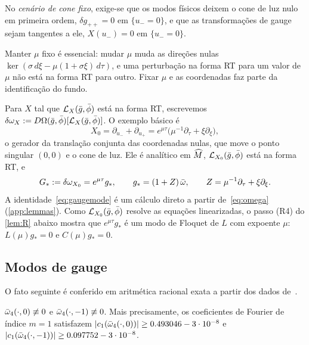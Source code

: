\begin{definition}\label{def:conefixed}
No \emph{cenário de cone fixo}, exige-se que os modos físicos deixem o cone de luz nulo em primeira ordem,
$\delta g_{++}=0$ em $\{u_-=0\}$, e que as transformações de gauge sejam tangentes a ele,
$X(u_-)=0$ em $\{u_-=0\}$.
\end{definition}

Manter $\mu$ fixo é essencial: mudar $\mu$ muda as direções nulas
$\ker(\sigma\,d\xi-\mu(1+\sigma\xi)\,d\tau)$, e uma perturbação na forma RT para um valor de $\mu$ não está na
forma RT para outro. Fixar $\mu$ e as coordenadas faz parte da identificação do fundo.

Para $X$ tal que $\mathcal{L}_X(\bar g,\bar\phi)$ está na forma RT, escrevemos
$\delta\omega_X:=D\Omega(\bar g,\bar\phi)[\mathcal{L}_X(\bar g,\bar\phi)]$. O exemplo básico é
\begin{equation}\label{eq:X0}
  X_0=\partial_{u_-}+\partial_{u_+}=e^{\mu\tau}\big(\mu^{-1}\partial_\tau+\xi\partial_\xi\big),
\end{equation}
o gerador da translação conjunta das coordenadas nulas, que move o ponto singular $(0,0)$ e
o cone de luz. Ele é analítico em $\widehat M$, $\mathcal{L}_{X_0}(\bar g,\bar\phi)$ está na forma RT, e
\begin{equation}\label{eq:gaugemode}
  G_*:=\delta\omega_{X_0}=e^{\mu\tau}g_*,\qquad g_*=(1+Z)\,\bar\omega,\qquad Z=\mu^{-1}\partial_\tau+\xi\partial_\xi .
\end{equation}
A identidade~\eqref{eq:gaugemode} é um cálculo direto a partir de~\eqref{eq:omega} (\cref{app:lemmas}). Como
$\mathcal{L}_{X_0}(\bar g,\bar\phi)$ resolve as equações linearizadas, o passo (R4) do \cref{lem:R} abaixo mostra que
$e^{\mu\tau}g_*$ é um modo de Floquet de $L$ com expoente $\mu$: $L(\mu)g_*=0$ e $C(\mu)g_*=0$.

\subsection{Modos de gauge}\label{sec:physical-gauge}

O fato seguinte é conferido em aritmética racional exata a partir dos dados de~\cite{RT2019}.

\begin{lemma}[F1]\label{lem:F1}
$\bar\omega_4(\cdot,0)\not\equiv0$ e $\bar\omega_4(\cdot,-1)\not\equiv0$. Mais precisamente, os coeficientes de
Fourier de índice $m=1$ satisfazem $|c_1(\bar\omega_4(\cdot,0))|\ge0.493046-3\cdot10^{-8}$ e
$|c_1(\bar\omega_4(\cdot,-1))|\ge0.097752-3\cdot10^{-8}$.
\end{lemma}


